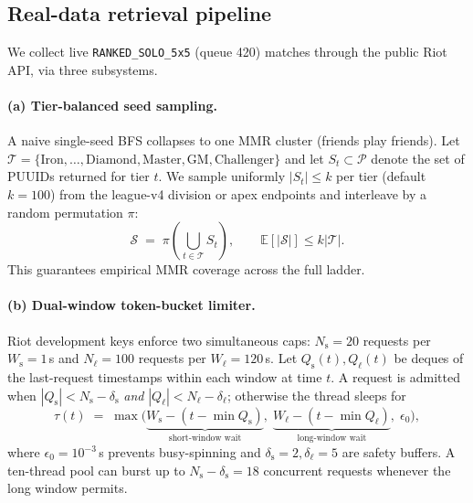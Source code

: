 \documentclass{article}
\begin{document}
\subsection{Real-data retrieval pipeline}
\label{sec:retrieval}
We collect live \texttt{RANKED\_SOLO\_5x5} (queue 420) matches through the
public Riot API, via three subsystems.

\paragraph{(a) Tier-balanced seed sampling.}
A naive single-seed BFS collapses to one MMR cluster (friends play friends).
Let $\mathcal{T} = \{\text{Iron}, \ldots, \text{Diamond}, \text{Master},
\text{GM}, \text{Challenger}\}$ and let $S_t \subset \mathcal{P}$ denote the
set of PUUIDs returned for tier $t$. We sample uniformly
$|S_t| \le k$ per tier (default $k = 100$) from the league-v4 division or
apex endpoints and interleave by a random permutation $\pi$:
\begin{equation}
\mathcal{S} \;=\; \pi\!\left(\bigcup_{t\in\mathcal{T}} S_t\right),
\qquad \mathbb{E}[|\mathcal{S}|] \le k|\mathcal{T}|.
\label{eq:seeds}
\end{equation}
This guarantees empirical MMR coverage across the full ladder.

\paragraph{(b) Dual-window token-bucket limiter.}
Riot development keys enforce two simultaneous caps:
$N_{\text{s}} = 20$ requests per $W_{\text{s}} = 1\,$s and
$N_{\ell} = 100$ requests per $W_{\ell} = 120\,$s. Let
$Q_{\text{s}}(t), Q_{\ell}(t)$ be deques of the last-request timestamps within
each window at time $t$. A request is admitted when
$|Q_{\text{s}}| < N_{\text{s}} - \delta_{\text{s}}$ \emph{and}
$|Q_{\ell}| < N_{\ell} - \delta_{\ell}$; otherwise the thread sleeps for
\begin{equation}
\tau(t) \;=\; \max\!\Big(
\underbrace{W_{\text{s}} - (t - \min Q_{\text{s}})}_{\text{short-window wait}},\;
\underbrace{W_{\ell} - (t - \min Q_{\ell})}_{\text{long-window wait}},\;
\epsilon_0 \Big),
\label{eq:ratelimit}
\end{equation}
where $\epsilon_0 = 10^{-3}\,$s prevents busy-spinning and
$\delta_{\text{s}} = 2, \delta_{\ell} = 5$ are safety buffers. A
ten-thread pool can burst up to $N_{\text{s}} - \delta_{\text{s}} = 18$
concurrent requests whenever the long window permits.
\end{document}

